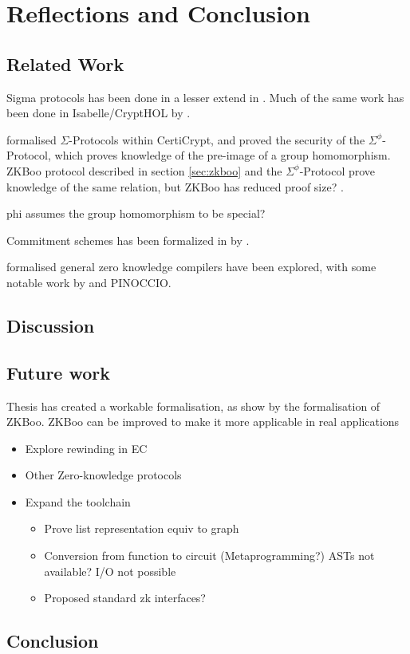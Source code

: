 \chapter{Reflections and Conclusion}
\label{sec:reflection_conclusion}

\section{Related Work}
\label{sec:related_work}

Sigma protocols has been done in a lesser extend in \easycrypt. Much of the same
work has been done in Isabelle/CryptHOL by \citeauthor{cryptoeprint:2019:1185}.

\citeauthor{certicrypt_sigma} formalised $\Sigma$-Protocols within CertiCrypt,
and proved the security of the $\Sigma^{\phi}$-Protocol, which proves knowledge
of the pre-image of a group homomorphism. ZKBoo protocol described in section
\ref{sec:zkboo} and the $\Sigma^{\phi}$-Protocol prove knowledge of the same
relation, but ZKBoo has reduced proof size? .

phi assumes the group homomorphism to be special?


Commitment schemes has been formalized in \easycrypt by
\citeauthor{DBLP:journals/corr/MetereD17}.


formalised general zero knowledge compilers have been explored, with some
notable work by \citeauthor{zkcrypt} and PINOCCIO.


\section{Discussion}
\label{sec:discussion}

\section{Future work}
\label{sec:future_work}
Thesis has created a workable formalisation, as show by the formalisation of ZKBoo. ZKBoo can be improved to make it more applicable in real applications 

\begin{itemize}
  \item Explore rewinding in EC
  \item Other Zero-knowledge protocols
  \item Expand the toolchain
    \begin{itemize}
      \item Prove list representation equiv to graph
      \item Conversion from function to circuit (Metaprogramming?) ASTs not available? I/O not possible
      \item Proposed standard zk interfaces?
    \end{itemize}
\end{itemize}


\section{Conclusion}
\label{sec:conclusion}


